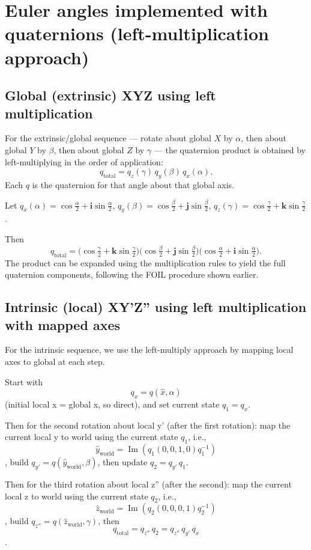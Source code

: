 \documentclass[11pt]{article}
\begin{document}
\section{Euler angles implemented with quaternions (left-multiplication approach)}
\subsection{Global (extrinsic) XYZ using left multiplication}
For the extrinsic/global sequence — rotate about global \(X\) by \(\alpha\), then about global \(Y\) by \(\beta\), then about global \(Z\) by \(\gamma\) — the quaternion product is obtained by left-multiplying in the order of application:
\[
q_\text{total} = q_z(\gamma)\, q_y(\beta)\, q_x(\alpha).
\]
Each \(q\) is the quaternion for that angle about that global axis.

Let \(q_x(\alpha)=\cos\frac{\alpha}{2} + \mathbf{i}\sin\frac{\alpha}{2}\), \(q_y(\beta)=\cos\frac{\beta}{2} + \mathbf{j}\sin\frac{\beta}{2}\), \(q_z(\gamma)=\cos\frac{\gamma}{2} + \mathbf{k}\sin\frac{\gamma}{2}\).

Then
\[
q_\text{total} = \big(\cos\tfrac{\gamma}{2}+\mathbf{k}\sin\tfrac{\gamma}{2}\big)
\big(\cos\tfrac{\beta}{2}+\mathbf{j}\sin\tfrac{\beta}{2}\big)
\big(\cos\tfrac{\alpha}{2}+\mathbf{i}\sin\tfrac{\alpha}{2}\big).
\]
The product can be expanded using the multiplication rules to yield the full quaternion components, following the FOIL procedure shown earlier.

\subsection{Intrinsic (local) XY'Z'' using left multiplication with mapped axes}
For the intrinsic sequence, we use the left-multiply approach by mapping local axes to global at each step.

Start with \[q_x = q(\hat{x},\alpha)\] (initial local x = global x, so direct), and set current state \(q_1 = q_x\).

Then for the second rotation about local y' (after the first rotation): map the current local y to world using the current state \(q_1\), i.e., \[\hat{y}_\text{world} = \operatorname{Im}(q_1 (0,0,1,0) q_1^{-1})\], build \(q_{y'} = q(\hat{y}_\text{world}, \beta)\), then update \(q_2 = q_{y'} \, q_1\).

Then for the third rotation about local z'' (after the second): map the current local z to world using the current state \(q_2\), i.e., \[\hat{z}_\text{world} = \operatorname{Im}(q_2 (0,0,0,1) q_2^{-1})\], build \(q_{z''} = q(\hat{z}_\text{world}, \gamma)\), then \[q_\text{total} = q_{z''} \, q_2 = \boxed{q_{z''} \, q_{y'} \, q_x}\].
\end{document}
